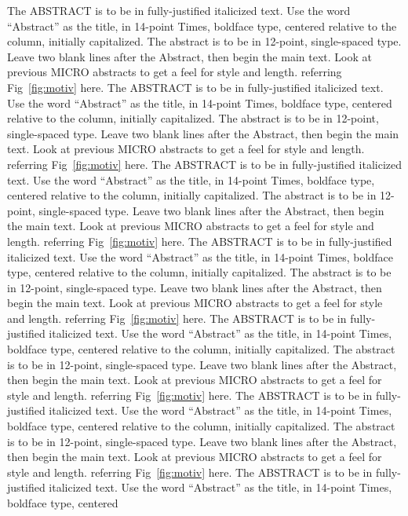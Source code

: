The ABSTRACT is to be in fully-justified italicized text. Use the word ``Abstract'' as the title, in
14-point Times, boldface type, centered relative to the column, initially capitalized. The abstract
is to be in 12-point, single-spaced type. Leave two blank lines after the Abstract, then begin the
main text. Look at previous MICRO abstracts to get a feel for style and length. referring
Fig~\ref{fig:motiv} here. The ABSTRACT is to be in fully-justified italicized text. Use the word
``Abstract'' as the title, in 14-point Times, boldface type, centered relative to the column,
initially capitalized. The abstract is to be in 12-point, single-spaced type. Leave two blank lines
after the Abstract, then begin the main text. Look at previous MICRO abstracts to get a feel for
style and length. referring Fig~\ref{fig:motiv} here. The ABSTRACT is to be in fully-justified
italicized text. Use the word ``Abstract'' as the title, in 14-point Times, boldface type, centered
relative to the column, initially capitalized. The abstract is to be in 12-point, single-spaced type.
Leave two blank lines after the Abstract, then begin the main text. Look at previous MICRO abstracts
to get a feel for style and length. referring Fig~\ref{fig:motiv} here. The ABSTRACT is to be in
fully-justified italicized text. Use the word ``Abstract'' as the title, in 14-point Times, boldface
type, centered relative to the column, initially capitalized. The abstract is to be in 12-point,
single-spaced type. Leave two blank lines after the Abstract, then begin the main text. Look at
previous MICRO abstracts to get a feel for style and length. referring Fig~\ref{fig:motiv} here. The
ABSTRACT is to be in fully-justified italicized text. Use the word ``Abstract'' as the title, in
14-point Times, boldface type, centered relative to the column, initially capitalized. The abstract
is to be in 12-point, single-spaced type. Leave two blank lines after the Abstract, then begin the
main text. Look at previous MICRO abstracts to get a feel for style and length. referring
Fig~\ref{fig:motiv} here. The ABSTRACT is to be in fully-justified italicized text. Use the word
``Abstract'' as the title, in 14-point Times, boldface type, centered relative to the column,
initially capitalized. The abstract is to be in 12-point, single-spaced type. Leave two blank lines
after the Abstract, then begin the main text. Look at previous MICRO abstracts to get a feel for
style and length. referring Fig~\ref{fig:motiv} here. The ABSTRACT is to be in fully-justified
italicized text. Use the word ``Abstract'' as the title, in 14-point Times, boldface type, centered
